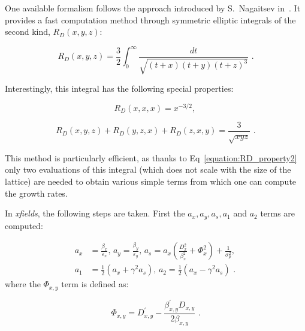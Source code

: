One available formalism follows the approach introduced by S.~Nagaitsev in~\cite{PRAB:Nagaitsev:IBS_formulas_fast_numerical_evaluation}.
It provides a fast computation method through symmetric elliptic integrals of the second kind, \(R_D(x,y,z)\):

\begin{equation}
    R_D(x, y, z) = \frac{3}{2} \int_{0}^{\infty} \frac{dt}{\sqrt{(t + x)(t + y)(t + z)^3}} \text{ .}
    \label{equation:elliptic_integrals}
\end{equation}

Interestingly, this integral has the following special properties:

\begin{equation}
    R_D(x, x, x) = x^{-3/2} \text{,  }
    \label{equation:RD_property1}
\end{equation}

\begin{equation}
    R_D(x, y, z) + R_D(y, z, x) + R_D(z, x, y) = \frac{3}{\sqrt{xyz}} \text{ .}
    \label{equation:RD_property2}
\end{equation}

This method is particularly efficient, as thanks to Eq~\eqref{equation:RD_property2} only two evaluations of this integral (which does not scale with the size of the lattice) are needed to obtain various simple terms from which one can compute the growth rates.
\newline

In \textit{xfields}, the following steps are taken.
First the \(a_x, a_y, a_s, a_1\) and \(a_2\) terms are computed:

\begin{equation}
    \begin{aligned}
        a_x &= \frac{\beta_x}{\varepsilon_x} \text{,  }
        a_y = \frac{\beta_y}{\varepsilon_y} \text{,  }
        a_s = a_x \left( \frac{D_x^{2}}{\beta_x^{2}} + \Phi_x^2 \right) + \frac{1}{\sigma_p^{2}} \text{,  } \\
        a_1 &= \frac{1}{2} (a_x + \gamma^2 a_s) \text{,  }
        a_2 = \frac{1}{2} (a_x - \gamma^2 a_s) \text{ .}
    \end{aligned}
    \label{equation:nagaitsev_step1}
\end{equation}
where the \(\Phi_{x,y}\) term is defined as:

\begin{equation}
    \Phi_{x,y} = D_{x,y}^{\prime} - \frac{\beta_{x,y}^{\prime} D_{x,y}}{2 \beta_{x,y}} \text{ .}
\end{equation}

